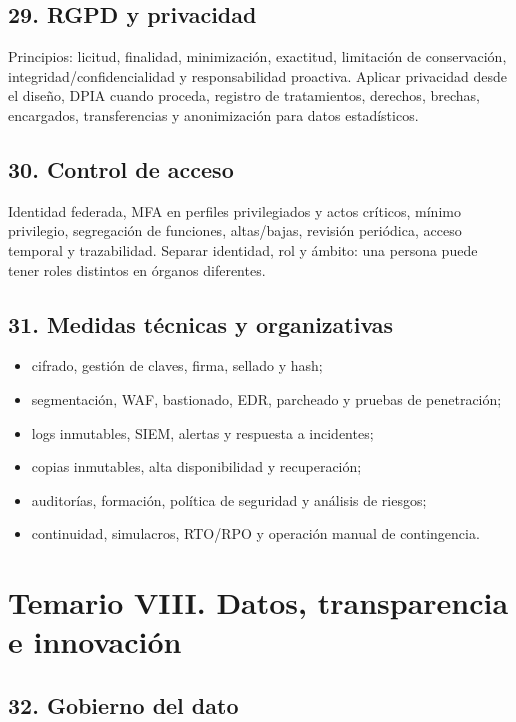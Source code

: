 \documentclass[11pt,a4paper]{article}
\begin{document}
\subsection{29. RGPD y privacidad}

Principios: licitud, finalidad, minimización, exactitud, limitación de conservación, integridad/confidencialidad y responsabilidad proactiva. Aplicar privacidad desde el diseño, DPIA cuando proceda, registro de tratamientos, derechos, brechas, encargados, transferencias y anonimización para datos estadísticos.

\subsection{30. Control de acceso}

Identidad federada, MFA en perfiles privilegiados y actos críticos, mínimo privilegio, segregación de funciones, altas/bajas, revisión periódica, acceso temporal y trazabilidad. Separar identidad, rol y ámbito: una persona puede tener roles distintos en órganos diferentes.

\subsection{31. Medidas técnicas y organizativas}
\begin{itemize}
\item cifrado, gestión de claves, firma, sellado y hash;
\item segmentación, WAF, bastionado, EDR, parcheado y pruebas de penetración;
\item logs inmutables, SIEM, alertas y respuesta a incidentes;
\item copias inmutables, alta disponibilidad y recuperación;
\item auditorías, formación, política de seguridad y análisis de riesgos;
\item continuidad, simulacros, RTO/RPO y operación manual de contingencia.
\end{itemize}

\section{Temario VIII. Datos, transparencia e innovación}

\subsection{32. Gobierno del dato}
\end{document}
